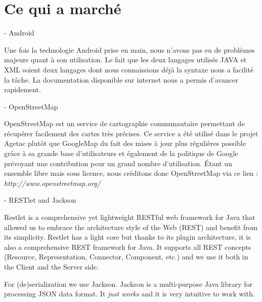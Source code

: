 \documentclass{article}
\begin{document}
\vspace{24pt}
\section*{{\LARGE {\color{color01} \textbf{Ce qui a marché }}}}

\vspace{13pt}
\parindent=3pt
{\large {\color{color01} - Android}}

\vspace{13pt}
\parindent=0pt
{\color{color01} Une fois la technologie Android prise en main, nous n'avons pas 
eu de problèmes majeurs quant à son utilisation. Le fait que les deux langages 
utilisés JAVA et XML soient deux langages dont nous connaissions déjà la syntaxe 
nous a facilité la tâche. La documentation disponible sur internet nous a permis 
d'avancer rapidement.  }

\vspace{27pt}
{\large {\color{color01} - OpenStreetMap}}

\vspace{13pt}
{\color{color01} OpenStreetMap est un service de cartographie communautaire permettant 
de récupérer facilement des cartes très précises. Ce service a été utilisé 
dans le projet Agetac plutôt que GoogleMap du fait des mises à jour plus régulières 
possible grâce à sa grande base d'utilisateurs et également de la politique 
de Google prévoyant une contribution pour un grand nombre d'utilisation. Étant 
un ensemble libre mais sous licence, nous créditons donc OpenStreetMap via ce 
lien : }{\color{color03} \emph{http://www.openstreetmap.org/}}

\vspace{13pt}
\parindent=3pt
{\large {\color{color01} - RESTlet and Jackson}}

\vspace{13pt}
\parindent=0pt
{\color{color01} Restlet is a comprehensive yet lightweight RESTful web framework 
for Java that allowed us to embrace the architecture style of the Web (REST) and 
benefit from its simplicity. Restlet has a light core but thanks to its plugin 
architecture, it is also a comprehensive REST framework for Java. It supports all 
REST concepts (Resource, Representation, Connector, Component, etc.) and we use 
it both in the Client and the Server side.}

\vspace{13pt}
{\color{color01} For (de)serialization we use Jackson. Jackson is a multi-purpose 
Java library for processing JSON data format. It }{\color{color01} \textit{just 
works}}{\color{color01}  and it is very intuitive to work with.}
\end{document}
